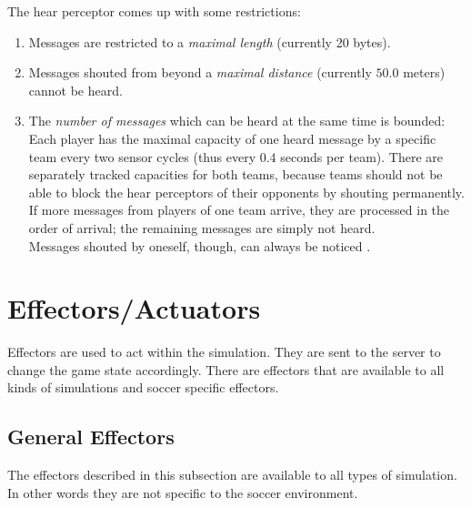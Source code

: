 The hear perceptor comes up with some restrictions:
\begin{enumerate}
	\item Messages are restricted to a \emph{maximal length} (currently 20 bytes).
	\item Messages shouted from beyond a \emph{maximal distance} (currently $50.0$ meters) cannot be heard.
	\item The \emph{number of messages} which can be heard at the same time is
	bounded: Each player has the maximal capacity of one heard message by a
	specific team every two sensor cycles (thus every $0.4$ seconds per team).
	There are separately tracked capacities for both teams, because teams should
	not be able to block the hear perceptors of their opponents by shouting
	permanently. If more messages from players of one team arrive, they are
	processed in the order of arrival; the remaining messages are simply not
	heard.\\ Messages shouted by oneself, though, can always be noticed
	\cite{Vorst06}.
\end{enumerate}


\section{Effectors/Actuators}
\label{sec:effectors}

Effectors are used to act within the simulation. They are sent to the server
to change the game state accordingly. There are effectors that are available to
all kinds of simulations and soccer specific effectors.



\subsection{General Effectors}
\label{sec:generaleffectors}

The effectors described in this subsection are available to all types of
simulation. In other words they are not specific to the soccer environment.

